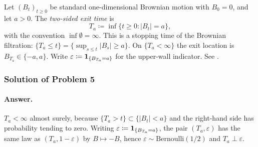 \documentclass[11pt,a4paper]{article}
\begin{document}
\begin{definition}
\label{def:bm-two-sided-exit}
Let \( (B_t)_{t\ge 0} \) be standard one-dimensional Brownian motion with \( B_0=0 \), and let \( a>0 \). The \emph{two-sided exit time} is
\[
T_a
\coloneqq
\inf\{t\ge 0:|B_t|=a\},
\]
with the convention \( \inf\emptyset=\infty \). This is a stopping time of the Brownian filtration: \( \{T_a\le t\}=\{\sup_{s\le t}|B_s|\ge a\} \). On \( \{T_a<\infty\} \) the exit location is \( B_{T_a}\in\{-a,a\} \). Write \( \varepsilon\coloneqq\mathbf{1}_{\{B_{T_a}=a\}} \) for the upper-wall indicator. See \citep[\S8.1, \S8.2]{durrett2010}.
\end{definition}

\subsubsection{Solution of Problem 5}

\paragraph{Answer.}
\( T_a<\infty \) almost surely, because \( \{T_a>t\}\subset\{|B_t|<a\} \) and the right-hand side has probability tending to zero. Writing \( \varepsilon\coloneqq\mathbf{1}_{\{B_{T_a}=a\}} \), the pair \( (T_a,\varepsilon) \) has the same law as \( (T_a,1-\varepsilon) \) by \( B\mapsto -B \), hence \( \varepsilon\sim\mathrm{Bernoulli}(1/2) \) and \( T_a\perp\varepsilon \).
\end{document}
